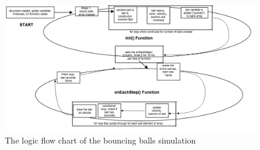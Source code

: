 \begin{figure}[t]  
  \centering
  \includegraphics[width=15cm]{Figures/ballsbouncing.png}
  \caption{The logic flow chart of the bouncing balls simulation}
  \label{blah}
\end{figure}





































